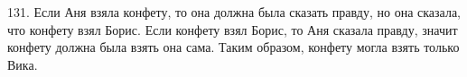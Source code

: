 131. Если Аня взяла конфету, то она должна была сказать правду, но она сказала, что конфету взял Борис. Если конфету взял Борис, то Аня сказала правду, значит конфету должна была взять она сама. Таким образом, конфету могла взять только Вика.\\
